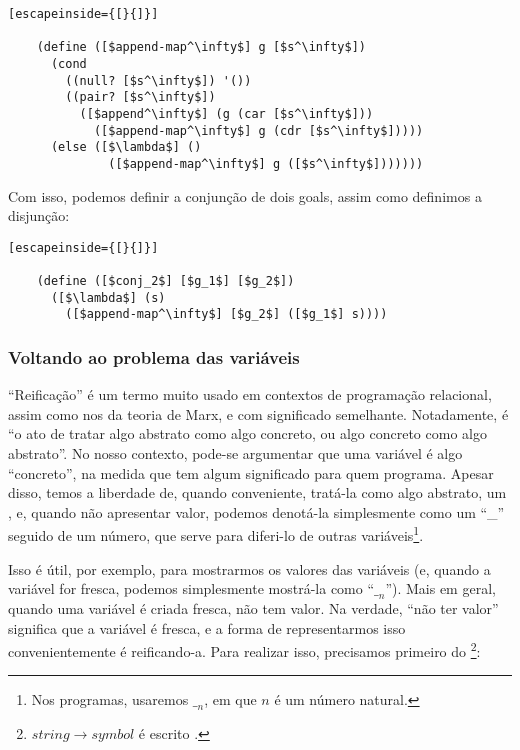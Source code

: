 \documentclass{article}
\begin{document}
  \begin{lstlisting}[escapeinside={[}{]}]

    (define ([$append-map^\infty$] g [$s^\infty$])
      (cond
        ((null? [$s^\infty$]) '())
        ((pair? [$s^\infty$])
          ([$append^\infty$] (g (car [$s^\infty$]))
            ([$append-map^\infty$] g (cdr [$s^\infty$]))))
      (else ([$\lambda$] ()
              ([$append-map^\infty$] g ([$s^\infty$]))))))

  \end{lstlisting}

  Com isso, podemos definir a conjunção de dois goals, assim como
  definimos a disjunção:

  \begin{lstlisting}[escapeinside={[}{]}]

    (define ([$conj_2$] [$g_1$] [$g_2$])
      ([$\lambda$] (s)
        ([$append-map^\infty$] [$g_2$] ([$g_1$] s))))

  \end{lstlisting}

  
  \subsubsection{Voltando ao problema das variáveis}


  ``Reificação'' é um termo muito usado em contextos de programação
  relacional, assim como nos da teoria de Marx, e com significado
  semelhante. Notadamente, é ``o ato de tratar algo abstrato como algo
  concreto, ou algo concreto como algo abstrato''. No nosso contexto,
  pode-se argumentar que uma variável é algo ``concreto'', na medida
  que tem algum significado para quem programa. Apesar disso, temos a
  liberdade de, quando conveniente, tratá-la como algo abstrato, um
  , e, quando não apresentar valor, podemos
  denotá-la simplesmente como um ``\_'' seguido de um número, que
  serve para diferi-lo de outras variáveis\footnote{Nos programas,
    usaremos $\__n$, em que $n$ é um número natural.}.

  Isso é útil, por exemplo, para mostrarmos os valores das variáveis
  (e, quando a variável for fresca, podemos simplesmente mostrá-la
  como ``$\__n$''). Mais em geral, quando uma variável é criada
  fresca, não tem valor. Na verdade, ``não ter valor'' significa que a
  variável é fresca, e a forma de representarmos isso convenientemente
  é reificando-a. Para realizar isso, precisamos primeiro do
  \footnote{$string\rightarrow symbol$ é escrito
    .}:
\end{document}
